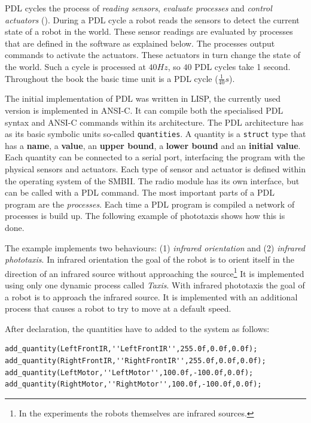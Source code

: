 PDL cycles the process of {\em reading sensors}, {\em evaluate processes} and {\em control actuators} (). During a PDL cycle a robot reads the sensors to detect the current state of a robot in the world. These sensor readings are evaluated by processes that are defined in the software as explained below. The processes output commands to activate the actuators. These actuators in turn change the state of the world. Such a cycle is processed at $40 Hz$, so $40$ PDL cycles take 1 second. Throughout the book the basic time unit is a PDL cycle ($\frac{1}{40} s$).

The initial implementation of PDL was written in LISP, the currently used version is implemented in ANSI-C. It can compile both the specialised PDL syntax and ANSI-C commands within its architecture. The PDL architecture has as its basic symbolic units so-called \texttt{quantities}. A quantity is a \texttt{struct} type that has a {\bf name}, a {\bf value}, an {\bf upper bound}, a {\bf lower bound} and an {\bf initial value}. Each quantity can be connected to a serial port, interfacing the program with the physical sensors and actuators. Each type of sensor and actuator is defined within the operating system of the SMBII. The radio module has its own interface, but can be called with a PDL command. The most important parts of a PDL program are the {\em processes}. Each time a PDL program is compiled a network of processes is build up. The following example of phototaxis shows how this is done.



The example implements two behaviours: (1) {\em infrared orientation} and (2) {\em infrared phototaxis}. In infrared orientation the goal of the robot is to orient itself in the direction of an infrared source without approaching the source\footnote{In the experiments the robots themselves are infrared sources.} It is implemented using only one dynamic process called {\em Taxis}. With infrared phototaxis the goal of a robot is to approach the infrared source. It is implemented with an additional process that causes a robot to try to move at a default speed. 


After declaration, the quantities have to added to the system as follows:


{\footnotesize\begin{verbatim}
add_quantity(LeftFrontIR,''LeftFrontIR'',255.0f,0.0f,0.0f);
add_quantity(RightFrontIR,''RightFrontIR'',255.0f,0.0f,0.0f);
add_quantity(LeftMotor,''LeftMotor'',100.0f,-100.0f,0.0f);
add_quantity(RightMotor,''RightMotor'',100.0f,-100.0f,0.0f);
\end{verbatim}}

